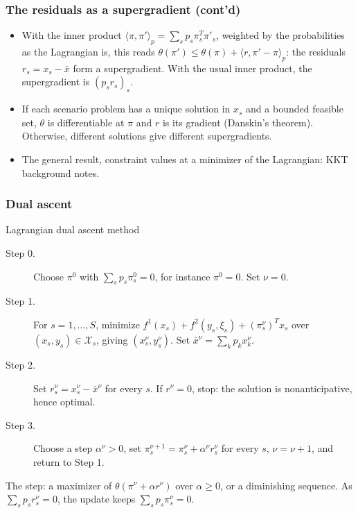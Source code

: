 \documentclass[aspectratio=169]{beamer}
\def\cX{\mathcal{X}}
\begin{document}
\begin{frame}
\frametitle{The residuals as a supergradient (cont'd)}

\begin{itemize}
\item
With the inner product $\langle \pi, \pi' \rangle_p = \sum_s p_s \pi_s^T \pi'_s$, weighted by the probabilities as the Lagrangian is, this reads $\theta(\pi') \leq \theta(\pi) + \langle r, \pi' - \pi \rangle_p$: the residuals $r_s = x_s - \bar{x}$ form a supergradient. With the usual inner product, the supergradient is $(p_s r_s)_s$.
\item
If each scenario problem has a unique solution in $x_s$ and a bounded feasible set, $\theta$ is differentiable at $\pi$ and $r$ is its gradient (Danskin's theorem). Otherwise, different solutions give different supergradients.
\item
The general result, constraint values at a minimizer of the Lagrangian: KKT background notes.
\end{itemize}

\end{frame}

\begin{frame}
\frametitle{Dual ascent}
\small

\begin{algo}{Lagrangian dual ascent method}
\begin{description}
\item[Step 0.] Choose $\pi^0$ with $\sum_s p_s \pi_s^0 = 0$, for instance $\pi^0 = 0$. Set $\nu = 0$.
\item[Step 1.]
For $s = 1,\ldots,S$, minimize $f^1(x_s) + f^2(y_s,\xi_s) + (\pi_s^{\nu})^T x_s$ over $(x_s, y_s) \in \cX_s$,
giving $(x_s^{\nu}, y_s^{\nu})$. Set $\bar{x}^{\nu} = \sum_k p_k x_k^{\nu}$.
\item[Step 2.]
Set $r_s^{\nu} = x_s^{\nu} - \bar{x}^{\nu}$ for every $s$. If $r^{\nu} = 0$, stop: the solution is nonanticipative, hence optimal.
\item[Step 3.]
Choose a step $\alpha^{\nu} > 0$, set $\pi_s^{\nu+1} = \pi_s^{\nu} + \alpha^{\nu} r_s^{\nu}$ for every $s$, $\nu = \nu+1$, and return to Step 1.
\end{description}
\end{algo}

The step: a maximizer of $\theta(\pi^{\nu} + \alpha r^{\nu})$ over $\alpha \geq 0$, or a diminishing sequence. As $\sum_s p_s r_s^{\nu} = 0$, the update keeps $\sum_s p_s \pi_s^{\nu} = 0$.

\end{frame}
\end{document}
